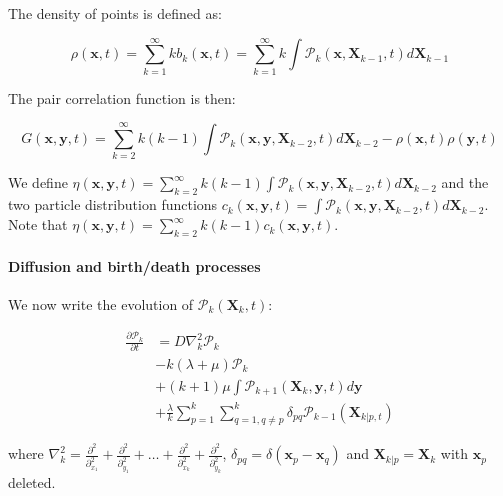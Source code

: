 The density of points is defined as:

\begin{equation}
\rho(\boldsymbol{x},t)=\sum_{k=1}^{\infty}kb_{k}(\boldsymbol{x},t)=\sum_{k=1}^{\infty}k\int\mathcal{P}_{k}(\boldsymbol{x},\boldsymbol{X}_{k-1},t)d\boldsymbol{X}_{k-1}
\end{equation}

The pair correlation function is then:

\begin{equation}
G(\boldsymbol{x},\boldsymbol{y},t)=\sum_{k=2}^{\infty}k(k-1)\int\mathcal{P}_{k}(\boldsymbol{x},\boldsymbol{y},\boldsymbol{X}_{k-2},t)d\boldsymbol{X}_{k-2}-\rho(\boldsymbol{x},t)\rho(\boldsymbol{y},t)\label{eq:def_pairdens}
\end{equation}

We define $\eta(\boldsymbol{x},\boldsymbol{y},t)=\sum_{k=2}^{\infty}k(k-1)\int\mathcal{P}_{k}(\boldsymbol{x},\boldsymbol{y},\boldsymbol{X}_{k-2},t)d\boldsymbol{X}_{k-2}$
and the two particle distribution functions $c_{k}(\boldsymbol{x},\boldsymbol{y},t)=\int\mathcal{P}_{k}(\boldsymbol{x},\boldsymbol{y},\boldsymbol{X}_{k-2},t)d\boldsymbol{X}_{k-2}$.
Note that $\eta(\boldsymbol{x},\boldsymbol{y},t)=\sum_{k=2}^{\infty}k(k-1)c_{k}(\boldsymbol{x},\boldsymbol{y},t)$.

\vspace{2em}


\paragraph*{Diffusion and birth/death processes}

We now write the evolution of $\mathcal{P}_{k}(\boldsymbol{X}_{k},t)$:

\begin{subequations} 
\begin{align}
\frac{\partial\mathcal{P}_{k}}{\partial t} & =D\nabla_{k}^{2}\mathcal{P}_{k}\label{pk_diffusion}\\
 & -k(\lambda+\mu)\mathcal{P}_{k}\label{pk_same_state}\\
 & +(k+1)\mu\int\mathcal{P}_{k+1}(\boldsymbol{X}_{k},\boldsymbol{y},t)d\boldsymbol{y}\label{pk_death}\\
 & +\frac{\lambda}{k}\sum_{p=1}^{k}\sum_{q=1,q\neq p}^{k}\delta_{pq}\mathcal{P}_{k-1}(\boldsymbol{X}_{k|p,t})\label{pk_birth}
\end{align}
\end{subequations}

where $\nabla_{k}^{2}=\frac{\partial^{2}}{\partial_{x_{1}}^{2}}+\frac{\partial^{2}}{\partial_{y_{1}}^{2}}+\ldots+\frac{\partial^{2}}{\partial_{x_{k}}^{2}}+\frac{\partial^{2}}{\partial_{y_{k}}^{2}}$,
$\delta_{pq}=\delta(\boldsymbol{x}_{p}-\boldsymbol{x}_{q})$ and $\boldsymbol{X}_{k|p}=\boldsymbol{X}_{k}$
with $\boldsymbol{x}_{p}$ deleted. \\

